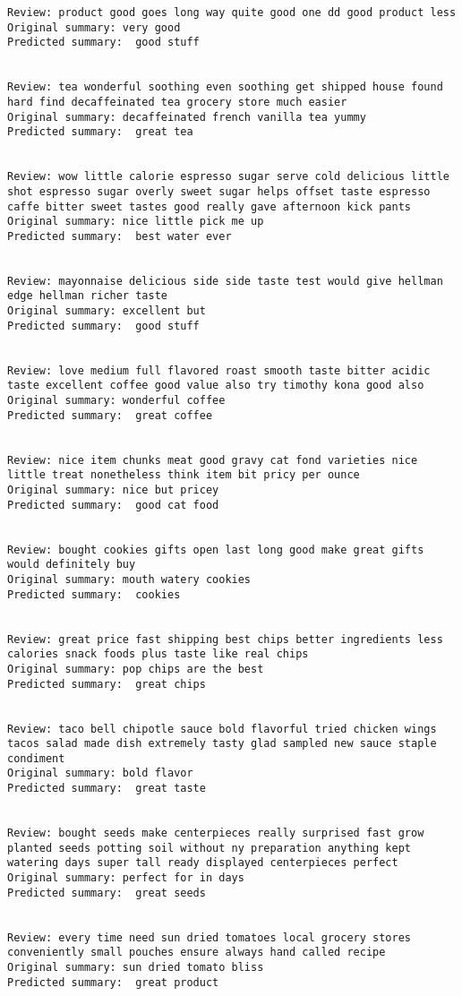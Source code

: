 \documentclass[11pt]{article}
\begin{document}
\begin{Verbatim}[commandchars=\\\{\}]
Review: product good goes long way quite good one dd good product less 
Original summary: very good 
Predicted summary:  good stuff


Review: tea wonderful soothing even soothing get shipped house found hard find decaffeinated tea grocery store much easier 
Original summary: decaffeinated french vanilla tea yummy 
Predicted summary:  great tea


Review: wow little calorie espresso sugar serve cold delicious little shot espresso sugar overly sweet sugar helps offset taste espresso caffe bitter sweet tastes good really gave afternoon kick pants 
Original summary: nice little pick me up 
Predicted summary:  best water ever


Review: mayonnaise delicious side side taste test would give hellman edge hellman richer taste 
Original summary: excellent but 
Predicted summary:  good stuff


Review: love medium full flavored roast smooth taste bitter acidic taste excellent coffee good value also try timothy kona good also 
Original summary: wonderful coffee 
Predicted summary:  great coffee


Review: nice item chunks meat good gravy cat fond varieties nice little treat nonetheless think item bit pricy per ounce 
Original summary: nice but pricey 
Predicted summary:  good cat food


Review: bought cookies gifts open last long good make great gifts would definitely buy 
Original summary: mouth watery cookies 
Predicted summary:  cookies


Review: great price fast shipping best chips better ingredients less calories snack foods plus taste like real chips 
Original summary: pop chips are the best 
Predicted summary:  great chips


Review: taco bell chipotle sauce bold flavorful tried chicken wings tacos salad made dish extremely tasty glad sampled new sauce staple condiment 
Original summary: bold flavor 
Predicted summary:  great taste


Review: bought seeds make centerpieces really surprised fast grow planted seeds potting soil without ny preparation anything kept watering days super tall ready displayed centerpieces perfect 
Original summary: perfect for in days 
Predicted summary:  great seeds


Review: every time need sun dried tomatoes local grocery stores conveniently small pouches ensure always hand called recipe 
Original summary: sun dried tomato bliss 
Predicted summary:  great product



\end{Verbatim}
\end{document}
